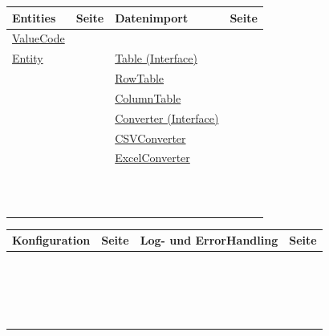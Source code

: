\vspace{-0.5cm}
\begin{table}[!h]
\begin{tabular}{p{5cm} c | p{5cm} c}
Entities & Seite & Datenimport & Seite\\
\hline
\hyperref[valCode]{ValueCode} & \pageref{valCode} &\nameref{uploadHandler} & \pageref{uploadHandler}\\
\hyperref[ent]{Entity} & \pageref{ent} &\hyperref[Table]{Table (Interface)} & \pageref{Table}\\
\nameref{prop} & \pageref{prop} &\hyperref[rowtable]{RowTable} & \pageref{rowtable}\\
\nameref{thing} & \pageref{thing} &\hyperref[colTable]{ColumnTable} & \pageref{colTable}\\
\nameref{data} & \pageref{data} &\hyperref[conv]{Converter (Interface)} & \pageref{conv}\\
\nameref{loc} & \pageref{loc} &\hyperref[csvConv]{CSVConverter} & \pageref{csvConv}\\
\nameref{sensor} & \pageref{sensor} &\hyperref[excelConv]{ExcelConverter} & \pageref{excelConv}\\
\nameref{oprop} & \pageref{oprop} &\nameref{obsCreator} & \pageref{obsCreator}\\
\nameref{uom} & \pageref{uom} &\nameref{dupl} & \pageref{dupl}\\
\ & \ &\nameref{timeParser} & \pageref{timeParser}\\
\ & \ &\nameref{tableParser} & \pageref{tableParser}
\end{tabular}
\end{table}

\vspace{-0.5cm}
\begin{table}[!h]
\begin{tabular}{p{5cm} c | p{5cm} c}
Konfiguration & Seite & Log- und ErrorHandling & Seite\\
\hline
\nameref{strCol} & \pageref{strCol} & \nameref{srow} & \pageref{srow}\\
\nameref{strObs} & \pageref{strObs} & \nameref{error} & \pageref{error}\\
\nameref{zoneCol} & \pageref{zoneCol} & \nameref{log} & \pageref{log}\\
\nameref{config} & \pageref{config} & \nameref{fileman} & \pageref{fileman}\\
\nameref{magic} & \pageref{magic} & \ & \ \\
\nameref{magicMap} & \pageref{magicMap} & \ & \ \\
\nameref{confman} & \pageref{confman} & \ & \ \\

\end{tabular}
\end{table}

